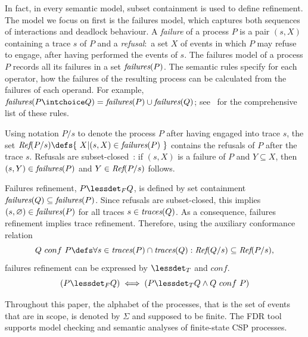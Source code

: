 In fact, in every semantic model, subset containment is used to define refinement. The
model we focus on first is the failures model, which captures both
sequences of interactions and deadlock behaviour. A \emph{failure} of a process $P$
is a pair $(s,X)$ containing a trace $s$ of $P$ and a \emph{refusal}:~a set $X$ of
events in which $P$ may refuse to engage, after having performed the events of
$s$. The failures model of a process $P$ records all its failures in a set
$\text{\it failures}(P)$. The semantic rules specify for each operator, how the failures of 
the resulting process can be calculated from the failures of each operand. For example, 
$\fails(P\intchoice Q) = \fails(P)\cup\fails(Q)$; see~\cite[p.~210]{Roscoe:1997:TPC:550448} for the comprehensive list of these rules.



Using notation $P/s$ to denote the process $P$ after having engaged into trace $s$,
the set 
$\refs(P/s) \defs \{~X | (s,X) \in \fails(P)~\}$ contains the  refusals
of $P$ after the
trace $s$. 
Refusals are subset-closed~\cite{Hoare:1985:CSP:3921,Roscoe2010}: if $(s,X)$ is a failure of $P$ and $Y\subseteq X$,
then $(s,Y)\in\text{\it failures}(P)$ and $Y\in\text{\it Ref}(P/s)$ follows.

Failures refinement, $P \lessdet_F Q$, is defined by set containment 
$\text{\it failures}(Q)\subseteq\text{\it failures}(P)$. Since refusals are subset-closed, this implies
$(s,\varnothing)\in\text{\it failures}(P)$ for all traces $s\in\text{\it traces}(Q)$. As a consequence, failures 
refinement implies trace refinement. Therefore, using the auxiliary 
conformance relation
\begin{equation}\label{eq:conf}
  Q\ conf\ P \defs \forall s\in \trc(P) \cap \trc(Q): \refs(Q/s)
  \subseteq \refs(P/s),
\end{equation}
failures refinement can be expressed by $\lessdet_T$ and $conf$.
\begin{equation}\label{thm:fref-tref-conf}
(P \lessdet_F Q) \iff (P \lessdet_T Q \land Q\ conf\ P)
\end{equation}





Throughout this paper, the alphabet of the processes, that is the set of
events that are in scope, is denoted by $\Sigma$ and supposed to be finite. 
The
FDR tool~\cite{fdr} supports model checking and semantic analyses of
finite-state CSP processes.


